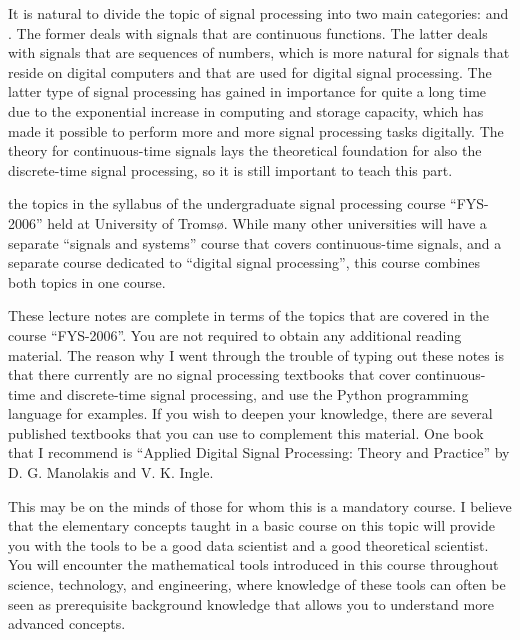 It is natural to divide the topic of signal processing into two main
categories: \emph{}
and \emph{}. The former deals with
signals that are continuous functions. The latter deals with signals
that are sequences of numbers, which is more natural for signals that
reside on digital computers and that are used for digital signal
processing. The latter type of signal processing has gained in
importance for quite a long time due to the exponential increase in
computing and storage capacity, which has made it possible to perform
more and more signal processing tasks digitally. The theory for
continuous-time signals lays the theoretical foundation for also the
discrete-time signal processing, so it is still important to teach
this part.

 the topics in the syllabus of the
undergraduate signal processing course ``FYS-2006'' held at University
of Troms\o{}. While many other universities will have a separate
``signals and systems'' course that covers continuous-time signals,
and a separate course dedicated to ``digital signal processing'', this
course combines both topics in one course.

These lecture notes are complete in terms of the topics that are
covered in the course ``FYS-2006''. You are not required to obtain any
additional reading material. The reason why I went through the trouble
of typing out these notes is that there currently are no signal
processing textbooks that cover continuous-time and discrete-time
signal processing, and use the Python programming language for
examples. If you wish to deepen your knowledge, there are several
published textbooks that you can use to complement this material. One
book that I recommend is ``Applied Digital Signal Processing: Theory
and Practice'' by D. G. Manolakis and V. K. Ingle.




This may be on the minds of those for whom this is a mandatory course.
I believe that the elementary concepts taught in a basic course on this topic will provide
you with the tools to be a good data scientist and a good theoretical scientist. You will encounter the mathematical tools
introduced in this course throughout science, technology, and engineering, where knowledge
of these tools can often be seen as prerequisite background knowledge
that allows you to understand more advanced concepts.

